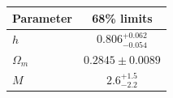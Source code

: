\begin{tabular} { l  c}

 Parameter &  68\% limits\\
\hline
{\boldmath$h              $} & $0.806^{+0.062}_{-0.054}   $\\

{\boldmath$Ω_m            $} & $0.2845\pm 0.0089          $\\

{\boldmath$M              $} & $2.6^{+1.5}_{-2.2}         $\\
\hline
\end{tabular}